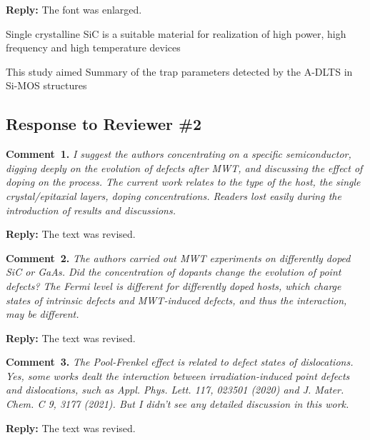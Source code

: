 \documentclass[10pt]{iopart}
\begin{document}
\noindent
\textcolor[rgb]{0.51,0.00,0.00}{\textbf{Reply:}}
The font was enlarged.





\cite{LightNeuIrrad:1,LightNeuIrrad:2,SiC:bookCh17}



Single crystalline SiC is a suitable material for realization of high power, high frequency and high
temperature devices


This study aimed
Summary of  the  trap parameters detected by  the A-DLTS in Si-MOS structures


\subsection*{Response to Reviewer \#2 }
\noindent
\textcolor[rgb]{0.00,0.50,1.00}{\textbf{Comment~1.}}
\emph{I suggest the authors concentrating on a specific semiconductor,
digging deeply on the evolution of defects after MWT,
and discussing the effect of doping on the process.
The current work relates to the type of the host,
the single crystal/epitaxial layers, doping concentrations.
Readers lost easily during the introduction of results and discussions.}

\noindent
\textcolor[rgb]{0.51,0.00,0.00}{\textbf{Reply:}}
The text was revised.


\vspace{1cm}
\noindent
\textcolor[rgb]{0.00,0.50,1.00}{\textbf{Comment~2.}}
\emph{The authors carried out MWT experiments on differently doped SiC or GaAs.
Did the concentration of dopants change the evolution of point defects?
The Fermi level is different for differently doped hosts,
which charge states of intrinsic defects and MWT-induced defects, and thus the interaction, may be different.}

\noindent
\textcolor[rgb]{0.51,0.00,0.00}{\textbf{Reply:}}
The text was revised.


\vspace{1cm}
\noindent
\textcolor[rgb]{0.00,0.50,1.00}{\textbf{Comment~3.}}
\emph{The Pool-Frenkel effect is related to defect states of dislocations.
Yes, some works dealt the interaction between irradiation-induced point defects and dislocations,
such as Appl. Phys. Lett. 117, 023501 (2020) and J. Mater. Chem. C 9, 3177 (2021).
But I didn’t see any detailed discussion in this work.}

\noindent
\textcolor[rgb]{0.51,0.00,0.00}{\textbf{Reply:}}
The text was revised.
\end{document}
